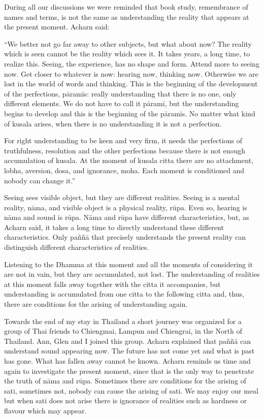During all our discussions we were reminded that book study, remembrance
of names and terms, is not the same as understanding the reality that
appears at the present moment. Acharn said:

``We better not go far away to other subjects, but what about now? The
reality which is seen cannot be the reality which sees it. It takes
years, a long time, to realize this. Seeing, the experience, has no
shape and form. Attend more to seeing now. Get closer to whatever is
now: hearing now, thinking now. Otherwise we are lost in the world of
words and thinking. This is the beginning of the development of the
perfections, pāramīs: really understanding that there is no one, only
different elements. We do not have to call it pāramī, but the
understanding begins to develop and this is the beginning of the
pāramīs. No matter what kind of kusala arises, when there is no
understanding it is not a perfection.

For right understanding to be keen and very firm, it needs the
perfections of truthfulness, resolution and the other perfections
because there is not enough accumulation of kusala. At the moment of
kusala citta there are no attachment, lobha, aversion, dosa, and
ignorance, moha. Each moment is conditioned and nobody can change it.''

Seeing sees visible object, but they are different realities. Seeing is
a mental reality, nāma, and visible object is a physical reality, rūpa.
Even so, hearing is nāma and sound is rūpa. Nāma and rūpa have different
characteristics, but, as Acharn said, it takes a long time to directly
understand these different characteristics. Only paññā that precisely
understands the present reality can distinguish different
characteristics of realities.

Listening to the Dhamma at this moment and all the moments of
considering it are not in vain, but they are accumulated, not lost. The
understanding of realities at this moment falls away together with the
citta it accompanies, but understanding is accumulated from one citta to
the following citta and, thus, there are conditions for the arising of
understanding again.

Towards the end of my stay in Thailand a short journey was organized for
a group of Thai friends to Chiengmai, Lampun and Chiengrai, in the North
of Thailand. Ann, Glen and I joined this group. Acharn explained that
paññā can understand sound appearing now. The future has not come yet
and what is past has gone. What has fallen away cannot be known. Acharn
reminds us time and again to investigate the present moment, since that
is the only way to penetrate the truth of nāma and rūpa. Sometimes there
are conditions for the arising of sati, sometimes not, nobody can cause
the arising of sati. We may enjoy our meal but when sati does not arise
there is ignorance of realities such as hardness or flavour which may
appear.

